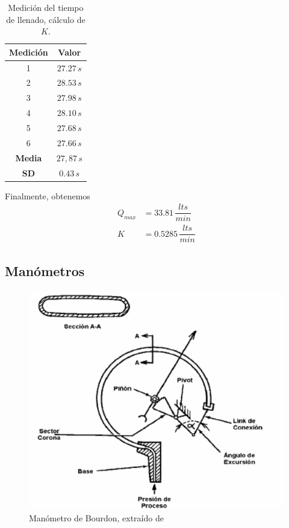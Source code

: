 \begin{table}
  \centering
  \bgroup
  \begin{tabular}{|c|c|}
  \hline
  Medición & Valor\\
  \hline
  1 & $27.27\,s$ \\
  2 & $28.53\,s$ \\
  3 & $27.98\,s$ \\
  4 & $28.10\,s$ \\
  5 & $27.68\,s$ \\
  6 & $27.66\,s$ \\
  \hline
  \hline
  \textbf{Media} & $27,87\,s$\\
  \textbf{SD} & $0.43\,s$\\
  \hline
  \end{tabular}
  \egroup
  \caption{Medición del tiempo de llenado, cálculo de $K$.}
  \label{tab:tiempoK}
\end{table}

Finalmente, obtenemos
\begin{align}
 Q_{max} &= 33.81\,\dfrac{lts}{min}
 \\
 K  &= 0.5285\,\dfrac{lts}{min}
\end{align}

\subsection{Manómetros}
\label{subsec:Manometros}

\begin{figure}[ht]
 \centering
 \includegraphics[width=.7\textwidth]{Cap2-DisenoEnsamblado/images/manomBourdon.png}
 \caption{Manómetro de Bourdon, extraído de \cite{bib:ApuntesPuglesiPlacaOrif}}
 \label{fig:manometroBourdon}
\end{figure}

